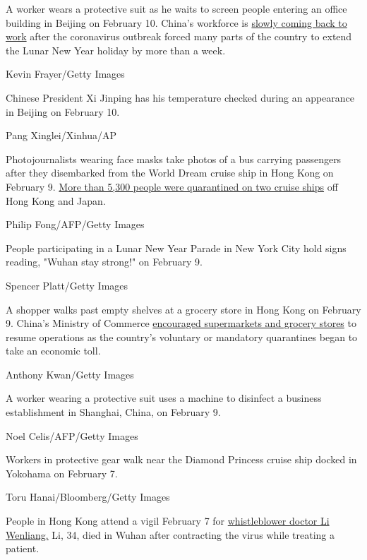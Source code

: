 A worker wears a protective suit as he waits to screen people entering
an office building in Beijing on February 10. China's workforce is
\href{https://edition.cnn.com/2020/02/10/business/china-companies-return-to-work-coronavirus/index.html}{slowly
coming back to work} after the coronavirus outbreak forced many parts of
the country to extend the Lunar New Year holiday by more than a week.

Kevin Frayer/Getty Images

Chinese President Xi Jinping has his temperature checked during an
appearance in Beijing on February 10.

Pang Xinglei/Xinhua/AP

Photojournalists wearing face masks take photos of a bus carrying
passengers after they disembarked from the World Dream cruise ship in
Hong Kong on February 9.
\href{https://www.cnn.com/2020/02/05/asia/coronavirus-cruise-quarantines-intl-hnk/index.html}{More
than 5,300 people were quarantined on two cruise ships} off Hong Kong
and Japan.

Philip Fong/AFP/Getty Images

People participating in a Lunar New Year Parade in New York City hold
signs reading, "Wuhan stay strong!" on February 9.

Spencer Platt/Getty Images

A shopper walks past empty shelves at a grocery store in Hong Kong on
February 9. China's Ministry of Commerce
\href{https://www.cnn.com/2020/02/06/asia/wuhan-coronavirus-update-intl-hnk/index.html}{encouraged
supermarkets and grocery stores} to resume operations as the country's
voluntary or mandatory quarantines began to take an economic toll.

Anthony Kwan/Getty Images

A worker wearing a protective suit uses a machine to disinfect a
business establishment in Shanghai, China, on February 9.

Noel Celis/AFP/Getty Images

Workers in protective gear walk near the Diamond Princess cruise ship
docked in Yokohama on February 7.

Toru Hanai/Bloomberg/Getty Images

People in Hong Kong attend a vigil February 7 for
\href{https://edition.cnn.com/2020/02/07/asia/china-doctor-death-censorship-intl-hnk/index.html}{whistleblower
doctor Li Wenliang.} Li, 34, died in Wuhan after contracting the virus
while treating a patient.

